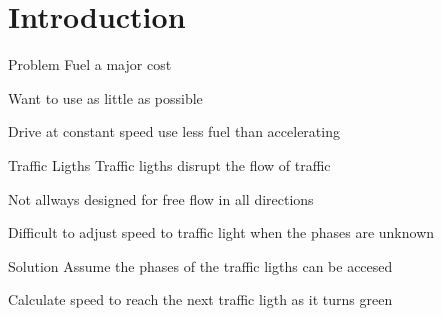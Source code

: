 

\section{Introduction}
\begin{frame}{Problem}
Fuel a major cost

Want to use as little as possible

Drive at constant speed use less fuel than accelerating
\end{frame}

\begin{frame}{Traffic Ligths}
Traffic ligths disrupt the flow of traffic

Not allways designed for free flow in all directions

Difficult to adjust speed to traffic light when the phases are unknown
\end{frame}

\begin{frame}{Solution}
Assume the phases of the traffic ligths can be accesed

Calculate speed to reach the next traffic ligth as it turns green
\end{frame}